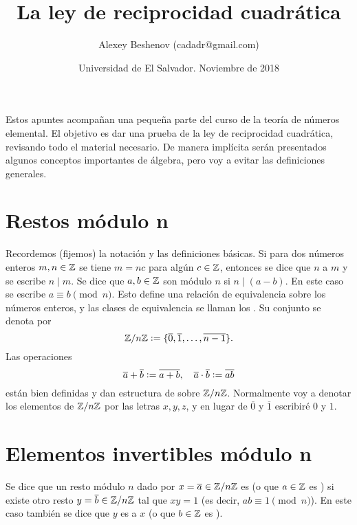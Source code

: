 \documentclass{article}
\author{Alexey Beshenov (cadadr@gmail.com)}
\title{La ley de reciprocidad cuadrática}
\date{Universidad de El Salvador. Noviembre de 2018}
\theoremstyle{plain}
\begin{document}
{\normalfont\sffamily\bfseries \maketitle}

Estos apuntes acompañan una pequeña parte del curso de la teoría de números
elemental. El objetivo es dar una prueba de la ley de reciprocidad cuadrática,
revisando todo el material necesario. De manera implícita serán presentados
algunos conceptos importantes de álgebra, pero voy a evitar las definiciones
generales.

\tableofcontents


\pagebreak
\setcounter{section}{-1}
\section{Restos módulo n}

Recordemos (fijemos) la notación y las definiciones básicas. Si para dos números
enteros $m,n \in \mathbb{Z}$ se tiene $m = nc$ para algún $c\in \mathbb{Z}$, entonces se dice
que $n$  a $m$ y se escribe $n \mid m$. Se dice que $a,b\in \mathbb{Z}$
son  módulo $n$ si $n \mid (a-b)$. En este caso se escribe
$a \equiv b \pmod{n}$. Esto define una relación de equivalencia sobre los
números enteros, y las clases de equivalencia se llaman los
. Su conjunto se denota por
$$\mathbb{Z}/n\mathbb{Z} \mathrel{\mathop:}= \{ \overline{0}, \overline{1}, \ldots, \overline{n-1} \}.$$
Las operaciones
\[ \overline{a} + \overline{b} \mathrel{\mathop:}= \overline{a+b}, \quad
  \overline{a}\cdot\overline{b} \mathrel{\mathop:}= \overline{ab} \]
están bien definidas y dan estructura de  sobre
$\mathbb{Z}/n\mathbb{Z}$. Normalmente voy a denotar los elementos de $\mathbb{Z}/n\mathbb{Z}$ por las letras
$x,y,z$, y en lugar de $\overline{0}$ y $\overline{1}$ escribiré $0$ y $1$.


\section{Elementos invertibles módulo n}

\begin{definicion}
  Se dice que un resto módulo $n$ dado por $x = \overline{a} \in \mathbb{Z}/n\mathbb{Z}$ es
   (o que $a \in \mathbb{Z}$ es ) si
  existe otro resto $y = \overline{b} \in \mathbb{Z}/n\mathbb{Z}$ tal que $xy = 1$ (es decir,
  $ab \equiv 1 \pmod{n}$). En este caso también se dice que $y$ es
   a $x$ (o que $b \in \mathbb{Z}$ es ).
\end{definicion}
\end{document}
